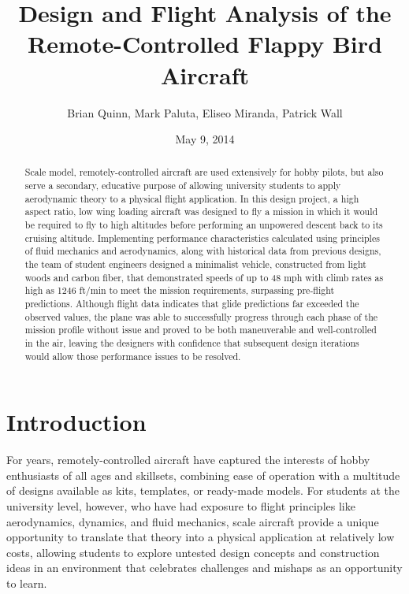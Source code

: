 \documentclass[titlepage]{article}
\begin{document}
\title{\textbf{Design and Flight Analysis of the Remote-Controlled Flappy Bird Aircraft}}
\author{Brian Quinn, Mark Paluta, Eliseo Miranda, Patrick Wall}
\date{May 9, 2014}
\maketitle

\begin{abstract}
Scale model, remotely-controlled aircraft are used extensively for hobby pilots, but also serve a secondary, educative purpose of allowing university students to apply aerodynamic theory to a physical flight application. In this design project, a high aspect ratio, low wing loading aircraft was designed to fly a mission in which it would be required to fly to high altitudes before performing an unpowered descent back to its cruising altitude. Implementing performance characteristics calculated using principles of fluid mechanics and aerodynamics, along with historical data from previous designs, the team of student engineers designed a minimalist vehicle, constructed from light woods and carbon fiber, that demonstrated speeds of up to 48 mph with climb rates as high as 1246 ft/min to meet the mission requirements, surpassing pre-flight predictions. Although flight data indicates that glide predictions far exceeded the observed values, the plane was able to successfully progress through each phase of the mission profile without issue and proved to be both maneuverable and well-controlled in the air, leaving the designers with confidence that subsequent design iterations would allow those performance issues to be resolved.
\end{abstract}

\tableofcontents
{}
\listoffigures
\listoftables
\pagebreak


\section{Introduction}
For years, remotely-controlled aircraft have captured the interests of hobby enthusiasts of all ages and skillsets, combining ease of operation with a multitude of designs available as kits, templates, or ready-made models. For students at the university level, however, who have had exposure to flight principles like aerodynamics, dynamics, and fluid mechanics, scale aircraft provide a unique opportunity to translate that theory into a physical application at relatively low costs, allowing students to explore untested design concepts and construction ideas in an environment that celebrates challenges and mishaps as an opportunity to learn. 
\end{document}
